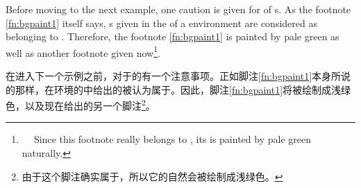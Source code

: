 Before moving to the next example, one caution is given for \bgpaint{} of
\Mgfnote{}s.  As the footnote \ref{fn:bgpaint1} itself says, \Mgfnote{}s
given in the \lpage{} of a  environment are considered as
belonging to \postenv{}.  Therefore, the footnote \ref{fn:bgpaint1} is
painted by pale green as well as another footnote given now\footnote{

Since this footnote really belongs to \postenv{}, its \bground{} is painted
by pale green naturally.}.

在进入下一个示例之前，对于\Mgfnote{}的\bgpaint{}有一个注意事项。正如脚注\ref{fn:bgpaint1}本身所说的那样，在环境的\lpage{}中给出的\Mgfnote{}被认为属于\postenv{}。因此，脚注\ref{fn:bgpaint1}将被绘制成浅绿色，以及现在给出的另一个脚注\footnote{由于这个脚注确实属于\postenv{}，所以它的\bground{}自然会被绘制成浅绿色。}。
\par\label{page:bgpaint4}

